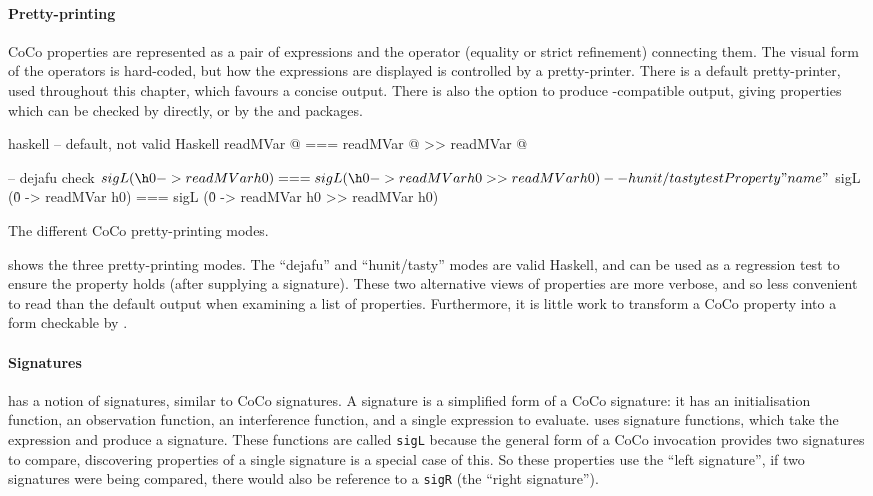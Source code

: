 \paragraph{Pretty-printing}
CoCo properties are represented as a pair of expressions and the
operator (equality or strict refinement) connecting them.  The visual
form of the operators is hard-coded, but how the expressions are
displayed is controlled by a pretty-printer.  There is a default
pretty-printer, used throughout this chapter, which favours a concise
output.  There is also the option to produce \dejafu{}-compatible
output, giving properties which can be checked by \dejafu{} directly,
or by the  and  packages.

\begin{listing}
  \centering
  \begin{cminted}{haskell}
-- default, not valid Haskell
readMVar @  ===  readMVar @ >> readMVar @

-- dejafu
check $ sigL (\h0 -> readMVar h0) === sigL (\h0 -> readMVar h0 >> readMVar h0)

-- hunit/tasty
testProperty "name" $
  sigL (\h0 -> readMVar h0) === sigL (\h0 -> readMVar h0 >> readMVar h0)
  \end{cminted}
  \caption{The different CoCo pretty-printing modes.}\label{lst:coco_ppr}
\end{listing}

 shows the three pretty-printing modes.  The
``dejafu'' and ``hunit/tasty'' modes are valid Haskell, and can be
used as a regression test to ensure the property holds (after
supplying a signature).  These two alternative views of properties are
more verbose, and so less convenient to read than the default output
when examining a list of properties.  Furthermore, it is little work
to transform a CoCo property into a form checkable by \dejafu{}.

\paragraph{Signatures}
\dejafu{} has a notion of signatures, similar to CoCo signatures.  A
\dejafu{} signature is a simplified form of a CoCo signature: it has
an initialisation function, an observation function, an interference
function, and a single expression to evaluate.  
uses signature functions, which take the expression and produce a
signature.  These functions are called \texttt{sigL} because the
general form of a CoCo invocation provides two signatures to compare,
discovering properties of a single signature is a special case of
this.  So these properties use the ``left signature'', if two
signatures were being compared, there would also be reference to a
\texttt{sigR} (the ``right signature'').

